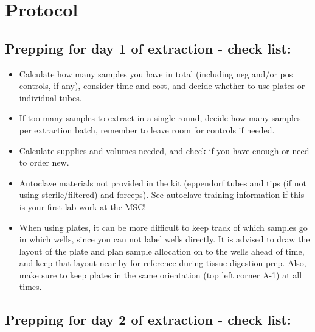 \documentclass[
  letterpaper,
  DIV=11,
  numbers=noendperiod]{scrreprt}
\begin{document}
\hypertarget{protocol-2}{%
\section*{\texorpdfstring{\textbf{Protocol}}{Protocol}}\label{protocol-2}}

\hypertarget{prepping-for-day-1-of-extraction---check-list}{%
\subsection*{\texorpdfstring{\textbf{Prepping for day 1 of extraction -
check
list:}}{Prepping for day 1 of extraction - check list:}}\label{prepping-for-day-1-of-extraction---check-list}}

\begin{itemize}
\item
  Calculate how many samples you have in total (including neg and/or pos
  controls, if any), consider time and cost, and decide whether to use
  plates or individual tubes.
\item
  If too many samples to extract in a single round, decide how many
  samples per extraction batch, remember to leave room for controls if
  needed.
\item
  Calculate supplies and volumes needed, and check if you have enough or
  need to order new.
\item
  Autoclave materials not provided in the kit (eppendorf tubes and tips
  (if not using sterile/filtered) and forceps). See autoclave training
  information if this is your first lab work at the MSC!
\item
  When using plates, it can be more difficult to keep track of which
  samples go in which wells, since you can not label wells directly. It
  is advised to draw the layout of the plate and plan sample allocation
  on to the wells ahead of time, and keep that layout near by for
  reference during tissue digestion prep. Also, make sure to keep plates
  in the same orientation (top left corner A-1) at all times.
\end{itemize}

\hypertarget{prepping-for-day-2-of-extraction---check-list}{%
\subsection*{\texorpdfstring{\textbf{Prepping for day 2 of extraction -
check
list:}}{Prepping for day 2 of extraction - check list:}}\label{prepping-for-day-2-of-extraction---check-list}}
\end{document}
